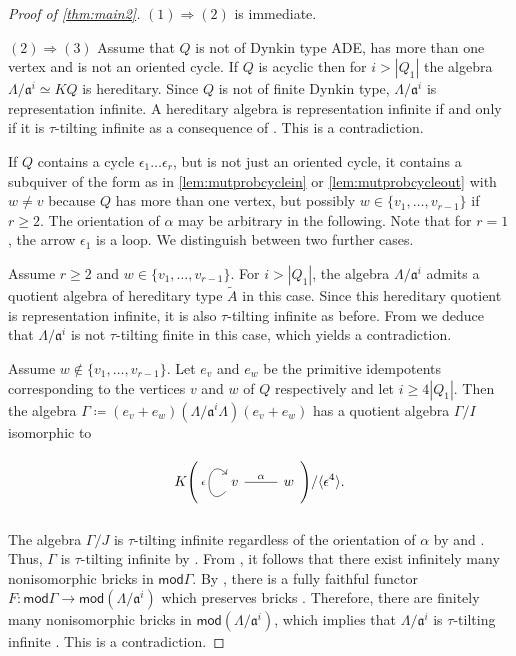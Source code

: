 \documentclass[11pt]{amsart}
\newcommand{\mods}{\mathsf{mod}}
\theoremstyle{definition}
\begin{document}
\begin{proof}[Proof of \cref{thm:main2}]
$(1) \Rightarrow (2)$ is immediate. 

$(2) \Rightarrow (3)$ Assume that $Q$ is not of Dynkin type ADE, has more than one vertex and is not an oriented cycle. 
If $Q$ is acyclic then for $i > |Q_1|$ the algebra $\Lambda/\mathfrak{a}^i \simeq KQ$ is hereditary. Since $Q$ is not of finite Dynkin type, $\Lambda/\mathfrak{a}^i $ is representation infinite. A hereditary algebra is representation infinite if and only if it is $\tau$-tilting infinite as a consequence of \cite[Cor. IV.4.7]{auslander_reiten_smalo_1995}. This is a contradiction.

If $Q$ contains a cycle $\epsilon_1 \dots \epsilon_r$, but is not just an oriented cycle, it contains a subquiver of the form as in \cref{lem:mutprobcyclein} or \cref{lem:mutprobcycleout} with $w \neq v$ because $Q$ has more than one vertex, but possibly $w \in \{ v_1, \dots, v_{r-1}\}$ if $r \geq 2$. The orientation of $\alpha$ may be arbitrary in the following. Note that for $r=1$, the arrow $\epsilon_1$ is a loop. We distinguish between two further cases.

Assume $r \geq 2$ and $w \in \{ v_1, \dots, v_{r-1}\}$. For $i > |Q_1|$, the algebra $\Lambda/\mathfrak{a}^i$ admits a quotient algebra of hereditary type $\widetilde{A}$ in this case. Since this hereditary quotient is representation infinite, it is also $\tau$-tilting infinite as before. From \cite[Cor. 1.9]{dirrt} we deduce that $\Lambda/\mathfrak{a}^i$ is not $\tau$-tilting finite in this case, which yields a contradiction.

Assume $w \not \in \{ v_1, \dots, v_{r-1}\}$. Let $e_{v}$ and $e_w$ be the primitive idempotents corresponding to the vertices $v$ and $w$ of $Q$ respectively and let $i \geq 4|Q_1|$. Then the algebra $\Gamma \coloneqq (e_{v} + e_w) (\Lambda/\mathfrak{a}^i \Lambda) (e_{v} + e_w)$ has a quotient algebra $\Gamma/I$ isomorphic to 
\[
K \Bigg( \begin{tikzcd}
    v \arrow[loop, "\epsilon", in=135, out = 225, looseness=5] \arrow[r, dash, "\alpha"] & w 
\end{tikzcd} \Bigg) / \langle \epsilon^4 \rangle .
\]

The algebra $\Gamma/J$ is $\tau$-tilting infinite regardless of the orientation of $\alpha$ by \cite[Thm. 1.1]{Wang2025} and \cite[Thm. 2.14]{tau}. Thus, $\Gamma$ is $\tau$-tilting infinite by \cite[Cor. 1.9]{dirrt}. From \cite[Thm. 1.4]{dij17}, it follows that there exist infinitely many nonisomorphic bricks in $\mods \Gamma$. By \cite[Thm. I.6.8]{assem_skowronski_simson_2006}, there is a fully faithful functor $F: \mods \Gamma \to \mods (\Lambda/\mathfrak{a}^i)$ which preserves bricks \cite[Lem. 2.1]{Zhang2023}. Therefore, there are finitely many nonisomorphic bricks in $\mods (\Lambda/\mathfrak{a}^i)$, which implies that $\Lambda/\mathfrak{a}^i$ is $\tau$-tilting infinite \cite[Thm. 1.4]{dij17}. This is a contradiction.


\end{proof}
\end{document}
